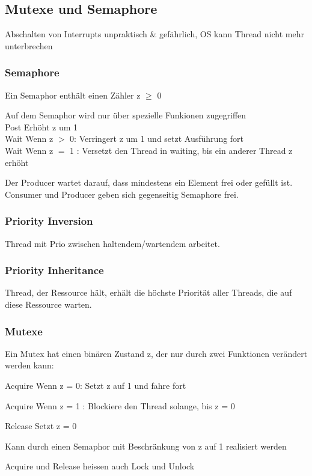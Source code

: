 \begin{multicols*}{5}
	

	
\vspace{-5pt}



\section{Mutexe und Semaphore}

\textcolor{h}{Abschalten von Interrupts} unpraktisch \& gefährlich, OS kann Thread nicht mehr unterbrechen


\subsubsection{Semaphore}

\begin{compactitem}[$\bullet$]
	\item Ein Semaphor enthält einen Zähler z $\geq$ 0
	\item Auf dem Semaphor wird nur über spezielle Funkionen zugegriffen\\
	\textcolor{h}{Post} Erhöht z um 1\\
	\textcolor{h}{Wait} Wenn z $>$ 0: Verringert z um 1 und setzt Ausführung fort\\
	\textcolor{h}{Wait} Wenn z $=$ 1 : Versetzt den Thread in waiting, bis ein anderer Thread z erhöht
\end{compactitem}
Der \textcolor{h}{Producer wartet} darauf, dass mindestens ein Element frei oder gefüllt ist. 
Consumer und Producer geben sich gegenseitig Semaphore frei.


\subsubsection{Priority Inversion}
Thread mit Prio zwischen haltendem/wartendem arbeitet.

\subsubsection{Priority Inheritance}
Thread, der Ressource hält, erhält die höchste Priorität aller Threads, die auf diese Ressource warten.


\subsubsection{Mutexe}
\begin{compactitem}[$\bullet$]
	\item Ein Mutex hat einen binären Zustand z, der nur durch zwei Funktionen verändert werden kann:
	\item \textcolor{h}{Acquire} Wenn z = 0: Setzt z auf 1 und fahre fort
	\item \textcolor{h}{Acquire} Wenn z = 1 : Blockiere den Thread solange, bis z = 0
	\item \textcolor{h}{Release} Setzt z = 0
	\item Kann durch einen Semaphor mit Beschränkung von z auf 1 realisiert werden 
	\item Acquire und Release heissen auch Lock und Unlock
\end{compactitem}


\end{multicols*}
